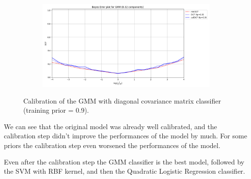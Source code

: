 \documentclass[12pt]{report}
\newcommand{\nnl}{%
    \newline
    \newline
}
\begin{document}
\begin{figure}[H]
    \centering
    \begin{subfigure}[t]{0.6\textwidth}
        \includegraphics[width=\textwidth]{./plot/calibration/GMM.png}
    \end{subfigure}
    \caption{Calibration of the GMM with diagonal covariance matrix classifier (training prior = 0.9).}
    \label{fig:calibration_GMM}
\end{figure}
\noindent
We can see that the original model was already well calibrated, and the calibration step didn't improve the performances of the model by much. For some priors the calibration step even worsened the performances of the model.
\nnl
Even after the calibration step the GMM classifier is the best model, followed by the SVM with RBF kernel, and then the Quadratic Logistic Regression classifier.
\end{document}
